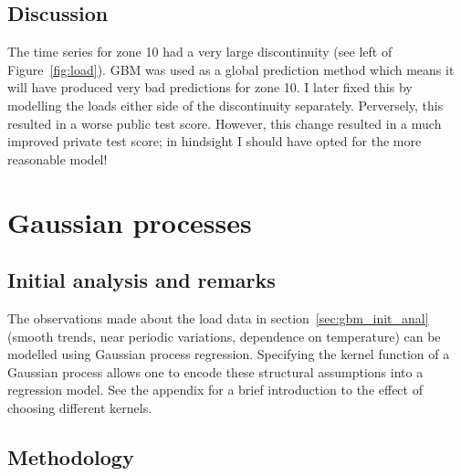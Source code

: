 \documentclass[final,authoryear,1p,times]{elsarticle}
\begin{document}
\subsection{Discussion}

The time series for zone 10 had a very large discontinuity (see left of Figure~\ref{fig:load}).
GBM was used as a global prediction method which means it will have produced very bad predictions for zone 10.
I later fixed this by modelling the loads either side of the discontinuity separately.
Perversely, this resulted in a worse public test score.
However, this change resulted in a much improved private test score; in hindsight I should have opted for the more reasonable model!

\section{Gaussian processes}

\label{sec:gp}

\subsection{Initial analysis and remarks}

The observations made about the load data in section~\ref{sec:gbm_init_anal} (\ie smooth trends, near periodic variations, dependence on temperature) can be modelled using Gaussian process regression.
Specifying the kernel function of a Gaussian process allows one to encode these structural assumptions into a regression model.
See the appendix for a brief introduction to the effect of choosing different kernels.

\subsection{Methodology}
\end{document}
